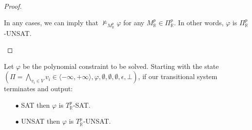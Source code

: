 \begin{proof}
\begin{enumerate}
\begin{itemize}
\begin{itemize}
In any cases, we can imply that $\not\models_{M^p_\mathbb{R}}\varphi$ for any $M^p_\mathbb{R} \in \Pi^p_\mathbb{R}$. In other words, $\varphi$ is $\Pi^p_\mathbb{R}$-UNSAT.
\end{itemize}
\end{itemize}
\end{enumerate}
\end{proof}

\begin{theorem}
Let $\varphi$ be the polynomial constraint to be solved. Starting with the state $(\Pi = \bigwedge\limits_{v_i \in V} v_i \in \langle -\infty, +\infty \rangle, \varphi, \emptyset, \emptyset, \emptyset, \epsilon, \bot)$, if our transitional system terminates and output:
\begin{itemize}
\item[$\bullet$] SAT then $\varphi$ is $T^p_\mathbb{R}$-SAT.
\item[$\bullet$] UNSAT then $\varphi$ is $T^p_\mathbb{R}$-UNSAT.
\end{itemize}
\end{theorem}

